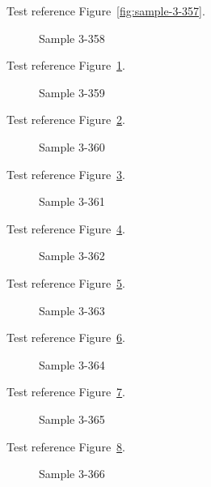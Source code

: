 Test reference Figure~\ref{fig:sample-3-357}.

\begin{figure}[tbhp]
\caption{Sample 3-358}
\label{fig:sample-3-358}
\end{figure}

Test reference Figure~\ref{fig:sample-3-358}.

\begin{figure}[tbhp]
\caption{Sample 3-359}
\label{fig:sample-3-359}
\end{figure}

Test reference Figure~\ref{fig:sample-3-359}.

\begin{figure}[tbhp]
\caption{Sample 3-360}
\label{fig:sample-3-360}
\end{figure}

Test reference Figure~\ref{fig:sample-3-360}.

\begin{figure}[tbhp]
\caption{Sample 3-361}
\label{fig:sample-3-361}
\end{figure}

Test reference Figure~\ref{fig:sample-3-361}.

\begin{figure}[tbhp]
\caption{Sample 3-362}
\label{fig:sample-3-362}
\end{figure}

Test reference Figure~\ref{fig:sample-3-362}.

\begin{figure}[tbhp]
\caption{Sample 3-363}
\label{fig:sample-3-363}
\end{figure}

Test reference Figure~\ref{fig:sample-3-363}.

\begin{figure}[tbhp]
\caption{Sample 3-364}
\label{fig:sample-3-364}
\end{figure}

Test reference Figure~\ref{fig:sample-3-364}.

\begin{figure}[tbhp]
\caption{Sample 3-365}
\label{fig:sample-3-365}
\end{figure}

Test reference Figure~\ref{fig:sample-3-365}.

\begin{figure}[tbhp]
\caption{Sample 3-366}
\label{fig:sample-3-366}
\end{figure}

